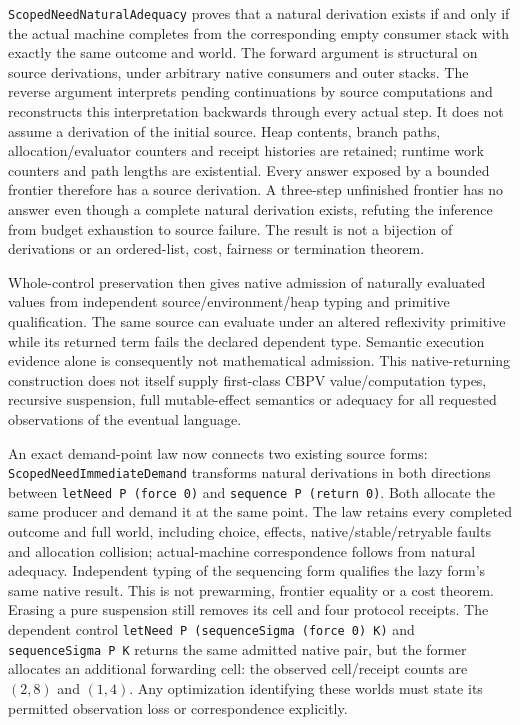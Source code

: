 \documentclass[11pt]{article}
\theoremstyle{definition}
\theoremstyle{remark}
\begin{document}
\nolinkurl{ScopedNeedNaturalAdequacy} proves that a natural derivation exists
if and only if the actual machine completes from the corresponding empty
consumer stack with exactly the same outcome and world. The forward argument
is structural on source derivations, under arbitrary native consumers and
outer stacks. The reverse argument interprets pending continuations by
source computations and reconstructs this interpretation backwards through
every actual step. It does not assume a derivation of the initial source.
Heap contents, branch paths, allocation/evaluator counters and receipt histories
are retained; runtime work counters and path lengths are existential.
Every answer exposed by a bounded frontier therefore has a source derivation.
A three-step unfinished frontier has no answer even though a complete natural
derivation exists, refuting the inference from budget exhaustion to source
failure. The result is not a bijection of derivations or an ordered-list,
cost, fairness or termination theorem.

Whole-control preservation then gives native admission of naturally evaluated
values from independent source/environment/heap typing and primitive
qualification. The same source can evaluate under an altered reflexivity
primitive while its returned term fails the declared dependent type. Semantic
execution evidence alone is consequently not mathematical admission.
This native-returning construction does not itself supply first-class
CBPV value/computation types, recursive suspension, full mutable-effect
semantics or adequacy for all requested observations of the eventual language.

An exact demand-point law now connects two existing source forms:
\nolinkurl{ScopedNeedImmediateDemand} transforms natural derivations in both
directions between \texttt{letNeed P (force 0)} and
\texttt{sequence P (return 0)}. Both allocate the same producer and demand it
at the same point. The law retains every completed outcome and full world,
including choice, effects, native/stable/retryable faults and allocation
collision; actual-machine correspondence follows from natural adequacy.
Independent typing of the sequencing form qualifies the lazy form's same
native result. This is not prewarming, frontier equality or a cost theorem.
Erasing a pure suspension still removes its cell and four protocol receipts.
The dependent control \texttt{letNeed P (sequenceSigma (force 0) K)} and
\texttt{sequenceSigma P K} returns the same admitted native pair, but the
former allocates an additional forwarding cell: the observed cell/receipt
counts are $(2,8)$ and $(1,4)$. Any optimization identifying these worlds
must state its permitted observation loss or correspondence explicitly.
\end{document}
